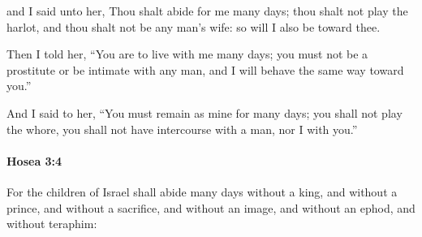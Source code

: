 			\begin{versebox}
					\item[BHS] 
					\item[LXX] 
					\item[ASV] and I said unto her, Thou shalt abide for me many days; thou shalt not play the harlot, and thou shalt not be any man's wife: so will I also be toward thee.
					\item[NIV] Then I told her, “You are to live with me many days; you must not be a prostitute or be intimate with any man, and I will behave the same way toward you.”
					\item[NRSV] And I said to her, “You must remain as mine for many days; you shall not play the whore, you shall not have intercourse with a man, nor I with you.”
			\end{versebox}

		\paragraph{Hosea 3:4} %
			\label{HOSEA-3-4}

			For the children of Israel shall abide many days without a king, and without a prince, and without a sacrifice, and without an image, and without an ephod, and without teraphim:

